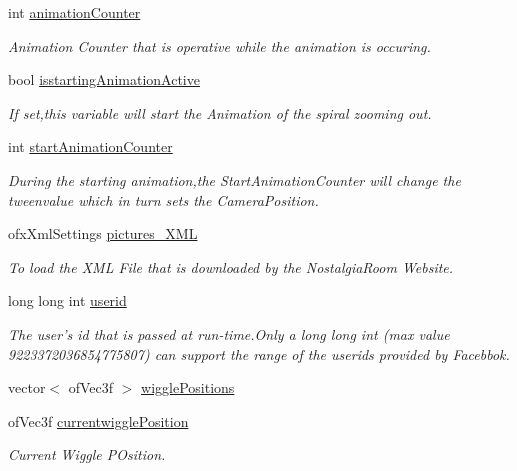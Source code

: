 \begin{DoxyCompactItemize}
int \hyperlink{group___camera_animation_ga21b16bdba744425519597fcb925df43a}{animation\-Counter}
\begin{DoxyCompactList}\small\item\em Animation Counter that is operative while the animation is occuring. \end{DoxyCompactList}\item 
bool \hyperlink{group___camera_animation_gab8a277e1055730fb5d6786ce0c4804b2}{isstarting\-Animation\-Active}
\begin{DoxyCompactList}\small\item\em If set,this variable will start the Animation of the spiral zooming out. \end{DoxyCompactList}\item 
int \hyperlink{group___camera_animation_ga577bf117cf10109de967ea0d3ca17f1f}{start\-Animation\-Counter}
\begin{DoxyCompactList}\small\item\em During the starting animation,the Start\-Animation\-Counter will change the tweenvalue which in turn sets the Camera\-Position. \end{DoxyCompactList}\item 
ofx\-Xml\-Settings \hyperlink{classtest_app_a85133f49103cfa002f39d882f7168236}{pictures\-\_\-\-X\-M\-L}
\begin{DoxyCompactList}\small\item\em To load the X\-M\-L File that is downloaded by the Nostalgia\-Room Website. \end{DoxyCompactList}\item 
long long int \hyperlink{classtest_app_a6ae76dc97fbeee00755f4a6cd6b87e19}{userid}
\begin{DoxyCompactList}\small\item\em The user's id that is passed at run-\/time.\-Only a long long int (max value 9223372036854775807) can support the range of the userids provided by Facebbok. \end{DoxyCompactList}\item 
vector$<$ of\-Vec3f $>$ \hyperlink{group___wiggle_ga5495d37f44bb3e3b00a04ad5910e0a6b}{wiggle\-Positions}
\item 
of\-Vec3f \hyperlink{group___wiggle_gaf81358868ae15faab1974ec074b1509f}{currentwiggle\-Position}
\begin{DoxyCompactList}\small\item\em Current Wiggle P\-Osition. \end{DoxyCompactList}\item 

\end{DoxyCompactItemize}
